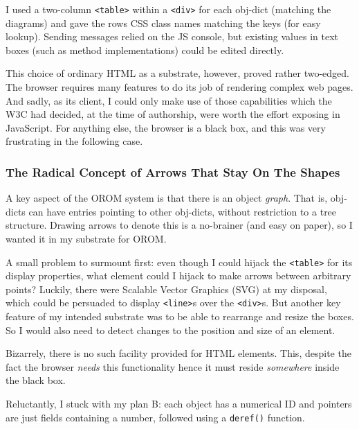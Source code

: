 I used a two-column \texttt{\textless{}table\textgreater{}} within a
\texttt{\textless{}div\textgreater{}} for each obj-dict (matching the
diagrams) and gave the rows CSS class names matching the keys (for easy
lookup). Sending messages relied on the JS console, but existing values
in text boxes (such as method implementations) could be edited directly.

This choice of ordinary HTML as a substrate, however, proved rather
two-edged. The browser requires many features to do its job of rendering
complex web pages. And sadly, as its client, I could only make use of
those capabilities which the W3C had decided, at the time of authorship,
were worth the effort exposing in JavaScript. For anything else, the
browser is a black box, and this was very frustrating in the following
case.

\hypertarget{the-radical-concept-of-arrows-that-stay-on-the-shapes}{%
\subsubsection{The Radical Concept of Arrows That Stay On The
Shapes}\label{the-radical-concept-of-arrows-that-stay-on-the-shapes}}

A key aspect of the OROM system is that there is an object \emph{graph}.
That is, obj-dicts can have entries pointing to other obj-dicts, without
restriction to a tree structure. Drawing arrows to denote this is a
no-brainer (and easy on paper), so I wanted it in my substrate for OROM.

A small problem to surmount first: even though I could hijack the
\texttt{\textless{}table\textgreater{}} for its display properties, what
element could I hijack to make arrows between arbitrary points? Luckily,
there were Scalable Vector Graphics (SVG) at my disposal, which could be
persuaded to display \texttt{\textless{}line\textgreater{}}s over the
\texttt{\textless{}div\textgreater{}}s. But another key feature of my
intended substrate was to be able to rearrange and resize the boxes. So
I would also need to detect changes to the position and size of an
element.

Bizarrely, there is no such facility provided for HTML elements. This,
despite the fact the browser \emph{needs} this functionality hence it
must reside \emph{somewhere} inside the black box.

Reluctantly, I stuck with my plan B: each object has a numerical ID and
pointers are just fields containing a number, followed using a
\texttt{deref()} function.


